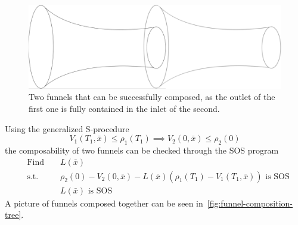 \begin{figure}
  \includegraphics[scale=.2]{figures/method/funnel-composition} \centering
  \caption{Two funnels that can be successfully composed, as the outlet of the
    first one is fully contained in the inlet of the second.}
  \label{fig:two-funnels-composed}
\end{figure}

Using the generalized S-procedure
\begin{equation}
  V_1(T_1,\bar{x}) \leq \rho_1(T_1) \implies V_2(0, \bar{x}) \leq \rho_2(0)
\end{equation}
the composability of two funnels can be checked through the \ac{SOS} program
\begin{align}
  & \text{Find } && L(\bar{x}) \\
  & \text{s.t. } && \rho_2(0) - V_2(0,\bar{x}) - L(\bar{x})\left( \rho_1(T_1) - V_1(T_1,\bar{x}) \right) \text{ is SOS} \nonumber \\ 
  &&& L(\bar{x}) \text{ is SOS} \nonumber
\end{align}
A picture of funnels composed together can be seen
in~\cref{fig:funnel-composition-tree}.
